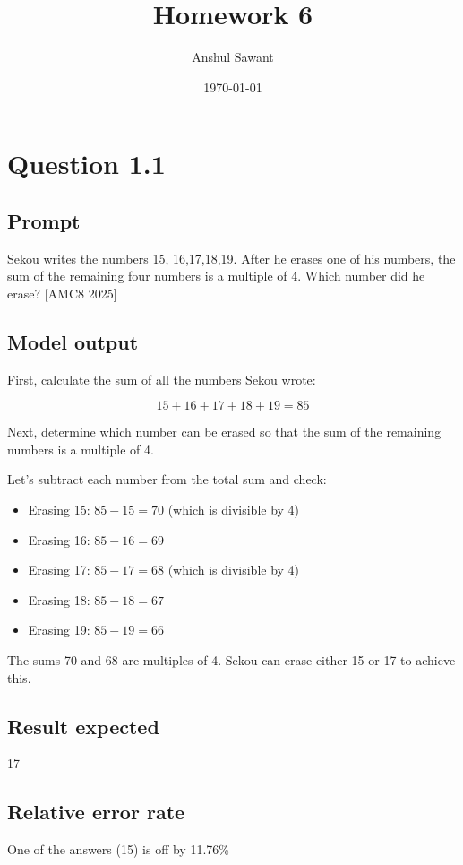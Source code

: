 \documentclass[11pt]{article}
\author{Anshul Sawant}
\date{\today}
\title{Homework 6}
\begin{document}
\maketitle
\tableofcontents


\section{Question 1.1}
\label{sec:org6cdec92}
\subsection{Prompt}
\label{sec:orgdc9bb8b}
Sekou writes the numbers 15, 16,17,18,19. After he erases one of his numbers, the sum of the remaining four numbers is a multiple of 4. Which number did he erase? [AMC8 2025]
\subsection{Model output}
\label{sec:org1cd5cdd}
First, calculate the sum of all the numbers Sekou wrote:

\[ 
15 + 16 + 17 + 18 + 19 = 85 
\]

Next, determine which number can be erased so that the sum of the remaining numbers is a multiple of 4. 

Let's subtract each number from the total sum and check:

\begin{itemize}
\item Erasing 15: \(85 - 15 = 70\) (which is divisible by 4)
\item Erasing 16: \(85 - 16 = 69\)
\item Erasing 17: \(85 - 17 = 68\) (which is divisible by 4)
\item Erasing 18: \(85 - 18 = 67\)
\item Erasing 19: \(85 - 19 = 66\)
\end{itemize}

The sums 70 and 68 are multiples of 4. Sekou can erase either 15 or 17 to achieve this.

\subsection{Result expected}
\label{sec:org894735a}
17

\subsection{Relative error rate}
\label{sec:orgef7f65b}
One of the answers (15) is off by 11.76\%
\end{document}
